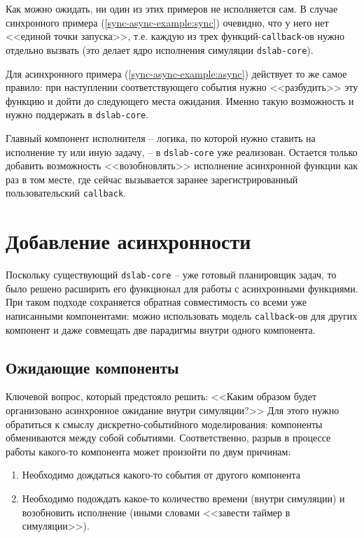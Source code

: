 Как можно ожидать, ни один из этих примеров не исполняется сам. В случае синхронного примера (\ref{sync-async-example:sync}) очевидно, что у него нет <<единой точки запуска>>, т.е. каждую из трех функций-\texttt{callback}-ов нужно отдельно вызвать (это делает ядро исполнения симуляции \texttt{dslab-core}). 

Для асинхронного примера (\ref{sync-async-example:async}) действует то же самое правило: при наступлении соответствующего события нужно <<разбудить>> эту функцию и дойти до следующего места ожидания. Именно такую возможность и нужно поддержать в \texttt{dslab-core}. 

Главный компонент исполнителя -- логика, по которой нужно ставить на исполнение ту или иную задачу, -- в \texttt{dslab-core} уже реализован. Остается только добавить возможность <<возобновлять>> исполнение асинхронной функции как раз в том месте, где сейчас вызывается заранее зарегистрированный пользовательский \texttt{callback}.


\section{Добавление асинхронности}

Поскольку существующий \texttt{dslab-core} -- уже готовый планировщик задач, то было решено расширить его функционал для работы с асинхронными функциями. При таком подходе сохраняется обратная совместимость со всеми уже написанными компонентами: можно использовать модель \texttt{callback}-ов для других компонент и даже совмещать две парадигмы внутри одного компонента. 

\subsection{Ожидающие компоненты}

Ключевой вопрос, который предстояло решить: <<Каким образом будет организовано асинхронное ожидание внутри симуляции?>> Для этого нужно обратиться к смыслу дискретно-событийного моделирования: компоненты обмениваются между собой событиями. Соответственно, разрыв в процессе работы какого-то компонента может произойти по двум причинам:
\begin{enumerate}
    \item Необходимо дождаться какого-то события от другого компонента 
    \item Необходимо подождать какое-то количество времени (внутри симуляции) и возобновить исполнение (иными словами <<завести таймер в симуляции>>).
\end{enumerate}

